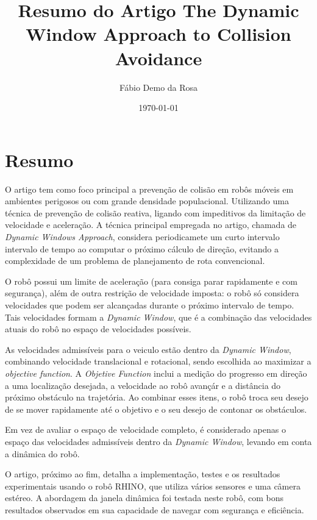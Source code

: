 \documentclass[12pt, a4paper]{article}
\begin{document}
\title{Resumo do Artigo The Dynamic Window Approach to Collision Avoidance}
\author{Fábio Demo da Rosa}
\date{\today}

\maketitle

\section*{Resumo}
	O artigo tem como foco principal a prevenção de colisão em robôs móveis em ambientes perigosos ou com grande densidade populacional. Utilizando uma técnica de prevenção de colisão reativa, ligando com impeditivos da limitação de velocidade e aceleração.
	A técnica principal empregada no artigo, chamada de \textit{Dynamic Windows Approach}, considera periodicamete um curto intervalo intervalo de tempo ao computar o próximo cálculo de direção, evitando a complexidade de um problema de planejamento de rota convencional.

	O robô possui um limite de aceleração (para consiga parar rapidamente e com segurança), além de outra restrição de velocidade imposta: o robô só considera velocidades que podem ser alcançadas durante o próximo intervalo de tempo. 
	Tais velocidades formam a \textit{Dynamic Window}, que é a combinação das velocidades atuais do robô no espaço de velocidades possíveis.

	As velocidades admissíveis para o veiculo estão dentro da \textit{Dynamic Window}, combinando velocidade translacional e rotacional, sendo escolhida ao maximizar a \textit{objective function}. A \textit{Objetive Function} inclui a medição do progresso em direção a uma localização desejada, a velocidade ao robô avançár e a distância do próximo obstáculo na trajetória.
	Ao combinar esses itens, o robô troca seu desejo de se mover rapidamente até o objetivo e o seu desejo de contonar os obstáculos.

	Em vez de avaliar o espaço de velocidade completo, é considerado apenas o espaço das velocidades admissíveis dentro da \textit{Dynamic Window}, levando em conta a dinâmica do robô. 

	O artigo, próximo ao fim, detalha a implementação, testes e os resultados experimentais usando o robô RHINO, que utiliza vários sensores e uma câmera estéreo. A abordagem da janela dinâmica foi testada neste robô, com bons resultados observados em sua capacidade de navegar com segurança e eficiência.
\end{document}
